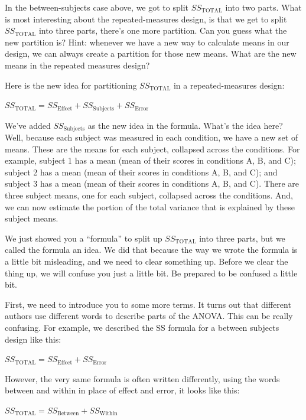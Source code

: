 \documentclass[
  letterpaper,
  DIV=11,
  numbers=noendperiod]{scrreprt}
\begin{document}
In the between-subjects case above, we got to split \(SS_\text{TOTAL}\)
into two parts. What is most interesting about the repeated-measures
design, is that we get to split \(SS_\text{TOTAL}\) into three parts,
there's one more partition. Can you guess what the new partition is?
Hint: whenever we have a new way to calculate means in our design, we
can always create a partition for those new means. What are the new
means in the repeated measures design?

Here is the new idea for partitioning \(SS_\text{TOTAL}\) in a
repeated-measures design:

\(SS_\text{TOTAL} = SS_\text{Effect} + SS_\text{Subjects} +SS_\text{Error}\)

We've added \(SS_\text{Subjects}\) as the new idea in the formula.
What's the idea here? Well, because each subject was measured in each
condition, we have a new set of means. These are the means for each
subject, collapsed across the conditions. For example, subject 1 has a
mean (mean of their scores in conditions A, B, and C); subject 2 has a
mean (mean of their scores in conditions A, B, and C); and subject 3 has
a mean (mean of their scores in conditions A, B, and C). There are three
subject means, one for each subject, collapsed across the conditions.
And, we can now estimate the portion of the total variance that is
explained by these subject means.

We just showed you a ``formula'' to split up \(SS_\text{TOTAL}\) into
three parts, but we called the formula an idea. We did that because the
way we wrote the formula is a little bit misleading, and we need to
clear something up. Before we clear the thing up, we will confuse you
just a little bit. Be prepared to be confused a little bit.

First, we need to introduce you to some more terms. It turns out that
different authors use different words to describe parts of the ANOVA.
This can be really confusing. For example, we described the SS formula
for a between subjects design like this:

\(SS_\text{TOTAL} = SS_\text{Effect} + SS_\text{Error}\)

However, the very same formula is often written differently, using the
words between and within in place of effect and error, it looks like
this:

\(SS_\text{TOTAL} = SS_\text{Between} + SS_\text{Within}\)
\end{document}
